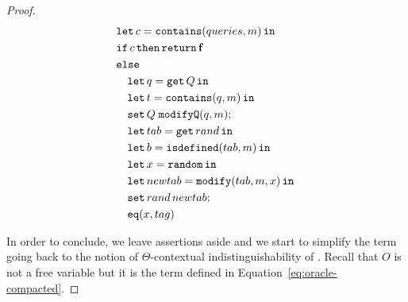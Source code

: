 \begin{proof}
{\begin{align*}
\begin{aligned}
    &\mathtt{let}\,c=\mathtt{contains}(queries, m)\,\mathtt{in}\, \\
    & \mathtt{if}\, c\, \mathtt{then} \, \mathtt{return}\, \mathbf{f} \\
    &\mathtt{else} \\
    &\quad\mathtt{let}\,q=\mathtt{get}\, Q\,\mathtt{in}\, \\
    &\quad\mathtt{let}\,t=\mathtt{contains}(q,m)\,\mathtt{in}\, \\
    &\quad \mathtt{set}\,Q\;\mathtt{modifyQ}(q, m); \\
    &\quad\mathtt{let}\,tab = \mathtt{get}\,rand\,\mathtt{in}\, \\
    &\quad\mathtt{let}\,b = \mathtt{isdefined}(tab, m)\,\mathtt{in}\, \\
    &\quad \mathtt{let}\,x = \mathtt{random}\,\mathtt{in}\, \\
    &\quad \mathtt{let}\,newtab = \mathtt{modify}(tab, m, x)\,\mathtt{in}\, \\
    &\quad \mathtt{set}\,rand\,newtab; \\
    &\quad \mathtt{eq}(x,tag)
\end{aligned}
\end{align*}
}

\normalsize

In order to conclude, we leave assertions aside and we start to simplify the term going back to the notion of $\Theta$-contextual indistinguishability of \cite{lago2024computationalindistinguishabilitylogicalrelations}. Recall that $O$ is not a free variable but it is the term defined in Equation~\ref{eq:oracle-compacted}.


\end{proof}
